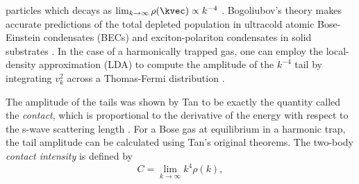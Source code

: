 	{particles \cite{Olshanii03,Decamp18,Chang16}} which decays as $\lim_{k\rightarrow\infty}\rho(\kvec)\propto k^{-4}$ \cite{PethickSmith,PitaevskiiStringari,Chang16}. 
	Bogoliubov's theory makes accurate predictions of the total depleted population in ultracold atomic Bose-Einstein condensates (BECs) \cite{Xu06,Lopes17_depletion} and exciton-polariton condensates in solid substrates \cite{Pieczarka20}.
	In the case of a harmonically trapped gas, one can employ the local-density approximation (LDA) to compute the amplitude of the $k^{-4}$ tail by  integrating $v_k^2$ across a Thomas-Fermi distribution \cite{Chang16}. 

	The amplitude of the tails was shown by Tan to be exactly the quantity called the \emph{contact}, which is proportional to the derivative of the energy with respect to the s-wave scattering length \cite{Tan08_momentum, Braaten11}.
	For a Bose gas at equilibrium in a harmonic trap, the tail amplitude can be calculated using Tan's original theorems. The two-body \emph{contact intensity} is defined by \cite{Tan08_momentum,Braaten11}
	\begin{equation}
		C = \lim_{k\rightarrow\infty}k^4\rho(k),
		\label{eqn:MomentumDef}
	\end{equation}
